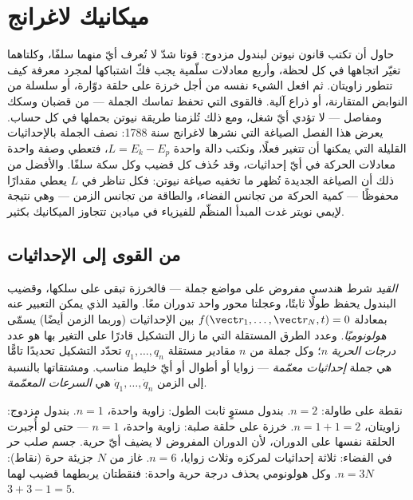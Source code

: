 \chapter{ميكانيك لاغرانج}\label{ch:b3:lagrangian-mechanics}

حاول أن تكتب قانون نيوتن لبندول مزدوج: قوتا شدّ لا تُعرف أيّ منهما
سلفًا، وكلتاهما تغيّر اتجاهها في كل لحظة، وأربع معادلات سلّمية يجب
فكّ اشتباكها لمجرد معرفة كيف تتطور زاويتان. ثم افعل الشيء نفسه من
أجل خرزة على حلقة دوّارة، أو سلسلة من النوابض المتقارنة، أو ذراع
آلية. فالقوى التي تحفظ تماسك الجملة --- من قضبان وسكك ومفاصل ---
لا تؤدي أيّ شغل، ومع ذلك تُلزمنا طريقة نيوتن بحملها في كل حساب.
يعرض هذا الفصل الصياغة التي نشرها لاغرانج سنة 1788: نصف الجملة
بالإحداثيات القليلة التي يمكنها أن تتغير فعلًا، ونكتب دالة واحدة
$L = E_k - E_p$، فتعطي وصفة واحدة معادلات الحركة في أيّ إحداثيات،
وقد حُذف كل قضيب وكل سكة سلفًا. والأفضل من ذلك أن الصياغة الجديدة
تُظهر ما تخفيه صياغة نيوتن: فكل تناظر في $L$ يعطي مقدارًا محفوظًا
--- كمية الحركة من تجانس الفضاء، والطاقة من تجانس الزمن --- وهي
نتيجة لإيمي نويتر غدت المبدأ المنظّم للفيزياء في ميادين تتجاوز
الميكانيك بكثير.

\section{من القوى إلى الإحداثيات}

\begin{definition}\label{def:b3:lagrangian-mechanics:coordinates}
\emph{القيد} شرط هندسي مفروض على مواضع جملة --- فالخرزة تبقى على
سلكها، وقضيب البندول يحفظ طولًا ثابتًا، وعجلتا محور واحد تدوران
معًا. والقيد الذي يمكن التعبير عنه بمعادلة
$f(\vect r_1, \dots, \vect r_N, t) = 0$ بين الإحداثيات (وربما الزمن
أيضًا) يسمّى \emph{هولونوميًا}. وعدد الطرق المستقلة التي ما زال
التشكيل قادرًا على التغير بها هو عدد \emph{درجات الحرية} $n$؛ وكل
جملة من $n$ مقادير مستقلة $q_1, \dots, q_n$ تحدّد التشكيل تحديدًا
تامًّا هي جملة \emph{إحداثيات معمّمة} --- زوايا أو أطوال أو أيّ خليط
مناسب. ومشتقاتها بالنسبة إلى الزمن $\dot q_1, \dots, \dot q_n$ هي
\emph{السرعات المعمّمة}.
\end{definition}

\begin{example}\label{ex:b3:lagrangian-mechanics:counting}
نقطة على طاولة: $n = 2$. بندول مستوٍ ثابت الطول: زاوية واحدة،
$n = 1$. بندول مزدوج: زاويتان، $n = 1 + 1 = 2$. خرزة على حلقة صلبة:
زاوية واحدة، $n = 1$ --- حتى لو أُجبرت الحلقة نفسها على الدوران،
لأن الدوران المفروض لا يضيف أيّ حرية. جسم صلب حر في الفضاء: ثلاثة
إحداثيات لمركزه وثلاث زوايا، $n = 6$. غاز من $N$ جزيئة حرة (نقاط):
$n = 3N$. وكل  هولونومي يحذف درجة حرية واحدة: فنقطتان يربطهما
قضيب لهما $3 + 3 - 1 = 5$.
\end{example}

